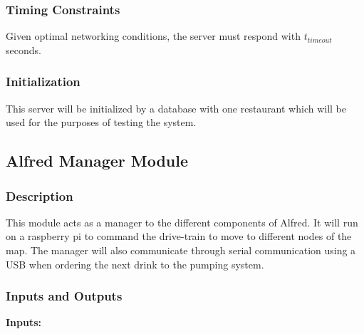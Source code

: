 \documentclass [10pt]{article}
\begin{document}
\subsubsection{Timing Constraints}
Given optimal networking conditions, the server must respond with  $ t_{timeout} $ seconds.


\subsubsection{Initialization}
This server will be initialized by a database with one restaurant which will be used for the purposes of testing the system.


\subsection{Alfred Manager Module}


\subsubsection{Description}
This module acts as a manager to the different components of Alfred. It will run on a raspberry pi to command the drive-train to move to different nodes of the map. The manager will also communicate through serial communication using a USB when ordering the next drink to the pumping system.


\subsubsection{Inputs and Outputs}


\textbf{Inputs: } \\
\end{document}
